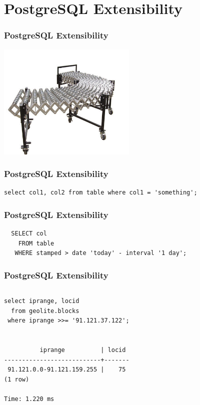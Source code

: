 \documentclass{beamer}
\begin{document}
\section{PostgreSQL Extensibility}

\begin{frame}[fragile]
  \frametitle{PostgreSQL Extensibility}

  \vfill

\begin{center}
  \includegraphics[height=15em]{extensible.jpg}
\end{center}
\end{frame}

\begin{frame}[fragile]
  \frametitle{PostgreSQL Extensibility}

\begin{verbatim}
select col1, col2 from table where col1 = 'something';
\end{verbatim}
\end{frame}

\begin{frame}[fragile]
  \frametitle{PostgreSQL Extensibility}

\begin{verbatim}
  SELECT col
    FROM table
   WHERE stamped > date 'today' - interval '1 day';
\end{verbatim}
\end{frame}

\begin{frame}[fragile]
  \frametitle{PostgreSQL Extensibility}

\begin{columns}
\begin{verbatim}
select iprange, locid
  from geolite.blocks
 where iprange >>= '91.121.37.122';


          iprange          | locid 
---------------------------+-------
 91.121.0.0-91.121.159.255 |    75
(1 row)

Time: 1.220 ms
\end{verbatim}
\end{columns}
\end{frame}
\end{document}
